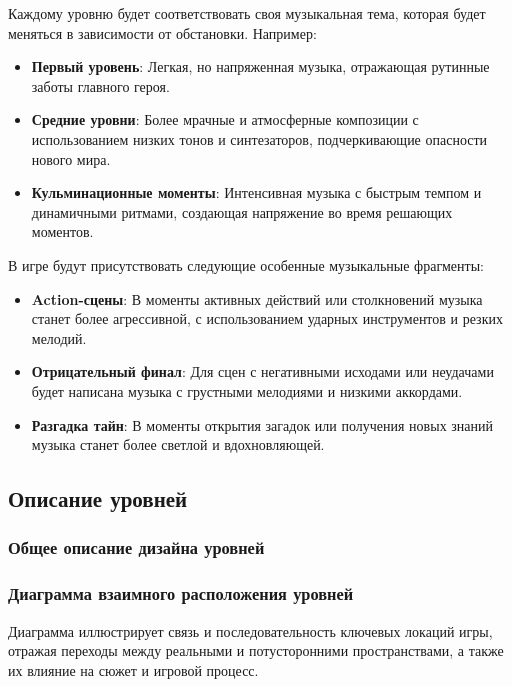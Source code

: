\documentclass{article}
\begin{document}
    Каждому уровню будет соответствовать своя музыкальная тема, которая будет меняться в зависимости от обстановки. Например:
    \begin{itemize}
        \item \textbf{Первый уровень}: Легкая, но напряженная музыка, отражающая рутинные заботы главного героя.
        \item \textbf{Средние уровни}: Более мрачные и атмосферные композиции с использованием низких тонов и синтезаторов, подчеркивающие опасности нового мира.
        \item \textbf{Кульминационные моменты}: Интенсивная музыка с быстрым темпом и динамичными ритмами, создающая напряжение во время решающих моментов.
    \end{itemize}
    
    В игре будут присутствовать следующие особенные музыкальные фрагменты:
    \begin{itemize}
        \item \textbf{Action-сцены}: В моменты активных действий или столкновений музыка станет более агрессивной, с использованием ударных инструментов и резких мелодий.
        \item \textbf{Отрицательный финал}: Для сцен с негативными исходами или неудачами будет написана музыка с грустными мелодиями и низкими аккордами.
        \item \textbf{Разгадка тайн}: В моменты открытия загадок или получения новых знаний музыка станет более светлой и вдохновляющей.
    \end{itemize}
    
	\subsection{Описание уровней}
	
	\subsubsection{Общее описание дизайна уровней}
	
	\newpage
	\subsubsection{Диаграмма взаимного расположения уровней}
	
	Диаграмма иллюстрирует связь и последовательность ключевых локаций игры, отражая переходы между реальными и потусторонними пространствами, а также их влияние на сюжет и игровой процесс.
	
\end{document}
